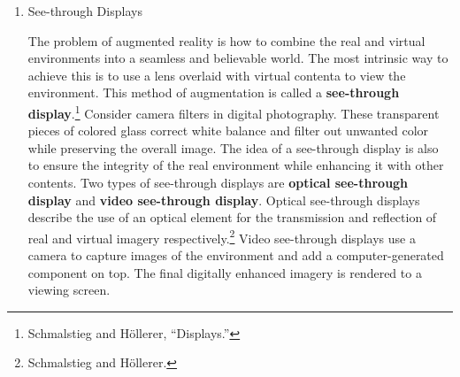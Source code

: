 \begin{enumerate}
	\item See-through Displays

The problem of augmented reality is how to combine the real and virtual environments into a seamless and believable world. The most intrinsic way to achieve this is to use a lens overlaid with virtual contenta to view the environment. This method of augmentation is called a \textbf{see-through display}.\footnote{Schmalstieg and Höllerer, “Displays.”} Consider camera filters in digital photography. These transparent pieces of colored glass correct white balance and filter out unwanted color while preserving the overall image. The idea of a see-through display is also to ensure the integrity of the real environment while enhancing it with other contents. Two types of see-through displays are \textbf{optical see-through display} and \textbf{video see-through display}. Optical see-through displays describe the use of an optical element for the transmission and reflection of real and virtual imagery respectively.\footnote{Schmalstieg and Höllerer.} Video see-through displays use a camera to capture images of the environment and add a computer-generated component on top. The final digitally enhanced imagery is rendered to a viewing screen.

\begin{figure}[!ht]
\end{figure}

\begin{figure}[!ht]
\end{figure}


\end{enumerate}
